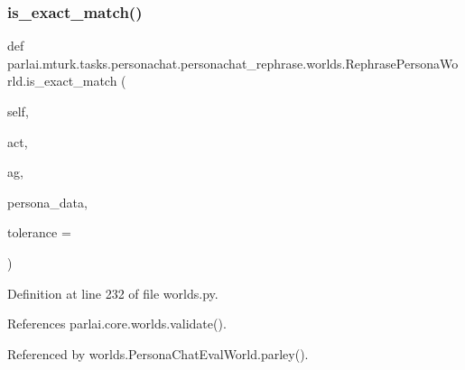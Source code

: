 \subsubsection{\texorpdfstring{is\+\_\+exact\+\_\+match()}{is\_exact\_match()}}
{\footnotesize\ttfamily def parlai.\+mturk.\+tasks.\+personachat.\+personachat\+\_\+rephrase.\+worlds.\+Rephrase\+Persona\+World.\+is\+\_\+exact\+\_\+match (\begin{DoxyParamCaption}\item[{}]{self,  }\item[{}]{act,  }\item[{}]{ag,  }\item[{}]{persona\+\_\+data,  }\item[{}]{tolerance = {} }\end{DoxyParamCaption})}



Definition at line 232 of file worlds.\+py.



References parlai.\+core.\+worlds.\+validate().



Referenced by worlds.\+Persona\+Chat\+Eval\+World.\+parley().


